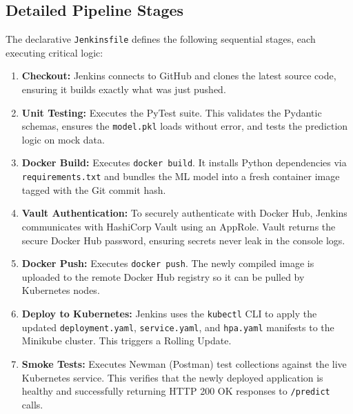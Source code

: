 \documentclass[12pt,a4paper]{article}
\begin{document}
\subsection{Detailed Pipeline Stages}
The declarative \texttt{Jenkinsfile} defines the following sequential stages, each executing critical logic:
\begin{enumerate}
    \item \textbf{Checkout:} Jenkins connects to GitHub and clones the latest source code, ensuring it builds exactly what was just pushed.
    \item \textbf{Unit Testing:} Executes the PyTest suite. This validates the Pydantic schemas, ensures the \texttt{model.pkl} loads without error, and tests the prediction logic on mock data.
    \item \textbf{Docker Build:} Executes \texttt{docker build}. It installs Python dependencies via \texttt{requirements.txt} and bundles the ML model into a fresh container image tagged with the Git commit hash.
    \item \textbf{Vault Authentication:} To securely authenticate with Docker Hub, Jenkins communicates with HashiCorp Vault using an AppRole. Vault returns the secure Docker Hub password, ensuring secrets never leak in the console logs.
    \item \textbf{Docker Push:} Executes \texttt{docker push}. The newly compiled image is uploaded to the remote Docker Hub registry so it can be pulled by Kubernetes nodes.
    \item \textbf{Deploy to Kubernetes:} Jenkins uses the \texttt{kubectl} CLI to apply the updated \texttt{deployment.yaml}, \texttt{service.yaml}, and \texttt{hpa.yaml} manifests to the Minikube cluster. This triggers a Rolling Update.
    \item \textbf{Smoke Tests:} Executes Newman (Postman) test collections against the live Kubernetes service. This verifies that the newly deployed application is healthy and successfully returning HTTP 200 OK responses to \texttt{/predict} calls.
\end{enumerate}
\end{document}
